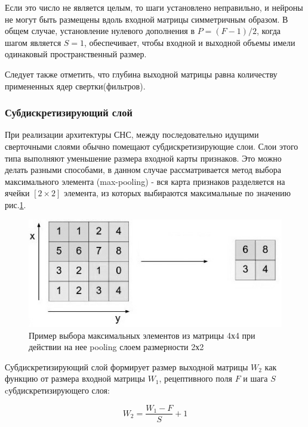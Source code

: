\documentclass[14pt]{article}
\numberwithin{figure}{section}
\numberwithin{equation}{section}
\begin{document}
Если это число не является целым, то шаги установлено неправильно, и нейроны не могут быть размещены вдоль входной матрицы симметричным образом. В общем случае, установление нулевого дополнения в $P = (F - 1) / 2$, когда шагом является $S = 1$, обеспечивает, чтобы входной и выходной объемы имели одинаковый пространственный размер.

Следует также отметить, что глубина выходной матрицы равна количеству примененных ядер свертки(фильтров).

\subsubsection{Субдискретизирующий слой}

При реализации архитектуры СНС, между последовательно идущими сверточными слоями обычно помещают субдискретизирующие слои. Слои этого типа выполняют уменьшение размера входной карты признаков. Это можно делать разными способами, в данном случае рассматривается метод выбора максимального элемента (max-pooling) - вся карта признаков разделяется на ячейки $[2 \times 2]$ элемента, из которых выбираются максимальные по значению рис.\ref{ris:7}.

\begin{figure}[h]
	\begin{center}
		\includegraphics[scale=0.7] {7.JPG}
		\caption{Пример выбора максимальных элементов из матрицы 4х4 при действии на нее pooling слоем размерности 2х2}
		\label{ris:7}
	\end{center}
\end{figure}

Субдискретизирующий слой формирует размер выходной матрицы $W_2$ как функцию от размера входной матрицы $W_1$, рецептивного поля $F$ и шага $S$ cубдискретизирующего слоя\cite{Stanford}:

\begin{equation}
	W_2 = \frac{W_1 - F}{S} + 1
\end{equation}
\end{document}
